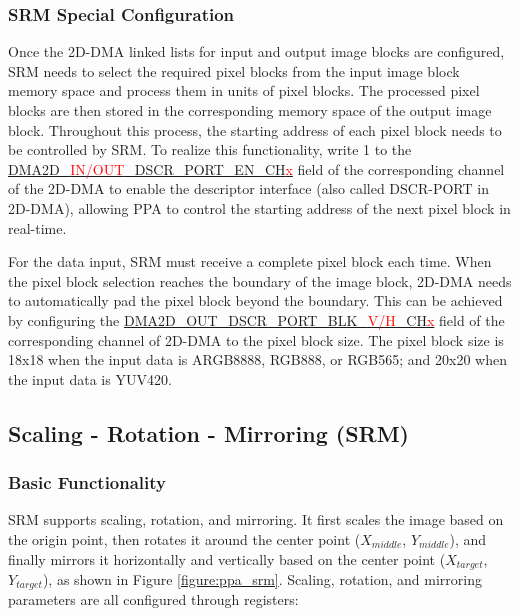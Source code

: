 \documentclass[main\_\_EN.tex]{subfiles}
\begin{document}
\subsubsection{SRM Special Configuration}

Once the 2D-DMA linked lists for input and output image blocks are configured, SRM needs to select the required pixel blocks from the input image block memory space and process them in units of pixel blocks. The processed pixel blocks are then stored in the corresponding memory space of the output image block. Throughout this process, the starting address of each pixel block needs to be controlled by SRM. To realize this functionality, write 1 to the \hyperref[fielddesc:DMA2DINDSCRPORTENCHN]{DMA2D\_\textcolor{red}{IN/OUT}\_DSCR\_PORT\_EN\_CH\textcolor{red}{x}} field of the corresponding channel of the 2D-DMA to enable the descriptor interface (also called DSCR-PORT in 2D-DMA), allowing PPA to control the starting address of the next pixel block in real-time.

For the data input, SRM must receive a complete pixel block each time. When the pixel block selection reaches the boundary of the image block, 2D-DMA needs to automatically pad the pixel block beyond the boundary. This can be achieved by configuring the \hyperref[fielddesc:DMA2DOUTDSCRPORTBLKHCHN]{DMA2D\_OUT\_DSCR\_PORT\_BLK\_\textcolor{red}{V/H}\_CH\textcolor{red}{x}} field of the corresponding channel of 2D-DMA to the pixel block size. The pixel block size is 18x18 when the input data is ARGB8888, RGB888, or RGB565; and 20x20 when the input data is YUV420.


\subsection{Scaling - Rotation - Mirroring (SRM)}

\subsubsection{Basic Functionality}

SRM supports scaling, rotation, and mirroring. It first scales the image based on the origin point, then rotates it around the center point ($X_{middle}$, $Y_{middle}$), and finally mirrors it horizontally and vertically based on the center point ($X_{target}$, $Y_{target}$), as shown in Figure \ref{figure:ppa_srm}. Scaling, rotation, and mirroring parameters are all configured through registers:
\end{document}
